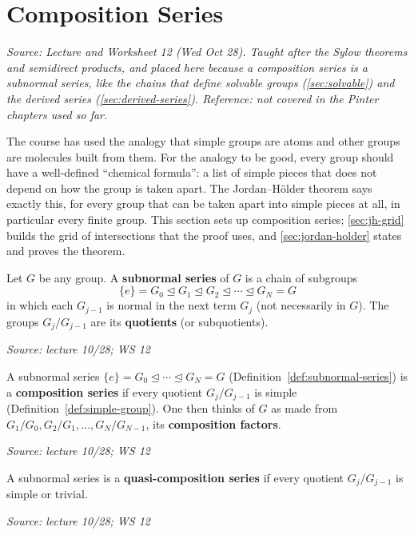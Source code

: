 \documentclass[11pt]{report}
\newcommand{\srcline}[1]{\par\hfill{\footnotesize\textit{Source: #1}}}
\begin{document}
\section{Composition Series}\label{sec:composition-series}

\textit{Source: Lecture and Worksheet 12 (Wed Oct 28). Taught after the Sylow theorems and semidirect products, and placed here because a composition series is a subnormal series, like the chains that define solvable groups (\ref{sec:solvable}) and the derived series (\ref{sec:derived-series}). Reference: not covered in the Pinter chapters used so far.}

The course has used the analogy that simple groups are atoms and other groups are molecules built from them. For the analogy to be good, every group should have a well-defined ``chemical formula'': a list of simple pieces that does not depend on how the group is taken apart. The Jordan--H\"older theorem says exactly this, for every group that can be taken apart into simple pieces at all, in particular every finite group. This section sets up composition series; \ref{sec:jh-grid} builds the grid of intersections that the proof uses, and \ref{sec:jordan-holder} states and proves the theorem.

\begin{defbox}\label{def:subnormal-series}
Let $G$ be any group. A \textbf{subnormal series} of $G$ is a chain of subgroups
\[ \{e\} = G_0 \trianglelefteq G_1 \trianglelefteq G_2 \trianglelefteq \cdots \trianglelefteq G_N = G \]
in which each $G_{j-1}$ is normal in the next term $G_j$ (not necessarily in $G$). The groups $G_j/G_{j-1}$ are its \textbf{quotients} (or subquotients).
\srcline{lecture 10/28; WS 12}
\end{defbox}

\begin{defbox}\label{def:composition-series}
A subnormal series $\{e\} = G_0 \trianglelefteq \cdots \trianglelefteq G_N = G$ (Definition~\ref{def:subnormal-series}) is a \textbf{composition series} if every quotient $G_j/G_{j-1}$ is simple (Definition~\ref{def:simple-group}). One then thinks of $G$ as made from $G_1/G_0, G_2/G_1, \ldots, G_N/G_{N-1}$, its \textbf{composition factors}.
\srcline{lecture 10/28; WS 12}
\end{defbox}

\begin{defbox}\label{def:quasi-composition-series}
A subnormal series is a \textbf{quasi-composition series} if every quotient $G_j/G_{j-1}$ is simple or trivial.
\srcline{lecture 10/28; WS 12}
\end{defbox}
\end{document}
